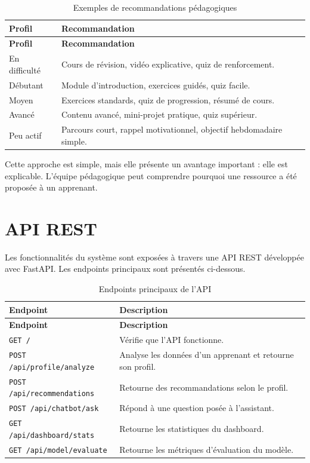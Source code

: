 \documentclass[12pt,a4paper]{report}
\begin{document}
\begin{longtable}{|p{4cm}|p{10cm}|}
\caption{Exemples de recommandations pédagogiques}\\
\hline
\textbf{Profil} & \textbf{Recommandation} \\
\hline
\endfirsthead
\hline
\textbf{Profil} & \textbf{Recommandation} \\
\hline
\endhead
En difficulté & Cours de révision, vidéo explicative, quiz de renforcement. \\
\hline
Débutant & Module d'introduction, exercices guidés, quiz facile. \\
\hline
Moyen & Exercices standards, quiz de progression, résumé de cours. \\
\hline
Avancé & Contenu avancé, mini-projet pratique, quiz supérieur. \\
\hline
Peu actif & Parcours court, rappel motivationnel, objectif hebdomadaire simple. \\
\hline
\end{longtable}

Cette approche est simple, mais elle présente un avantage important : elle est explicable. L'équipe pédagogique peut comprendre pourquoi une ressource a été proposée à un apprenant.

\section{API REST}

Les fonctionnalités du système sont exposées à travers une API REST développée avec FastAPI. Les endpoints principaux sont présentés ci-dessous.

\begin{longtable}{|p{5cm}|p{9cm}|}
\caption{Endpoints principaux de l'API}\\
\hline
\textbf{Endpoint} & \textbf{Description} \\
\hline
\endfirsthead
\hline
\textbf{Endpoint} & \textbf{Description} \\
\hline
\endhead
\texttt{GET /} & Vérifie que l'API fonctionne. \\
\hline
\texttt{POST /api/profile/analyze} & Analyse les données d'un apprenant et retourne son profil. \\
\hline
\texttt{POST /api/recommendations} & Retourne des recommandations selon le profil. \\
\hline
\texttt{POST /api/chatbot/ask} & Répond à une question posée à l'assistant. \\
\hline
\texttt{GET /api/dashboard/stats} & Retourne les statistiques du dashboard. \\
\hline
\texttt{GET /api/model/evaluate} & Retourne les métriques d'évaluation du modèle. \\
\hline
\end{longtable}
\end{document}

